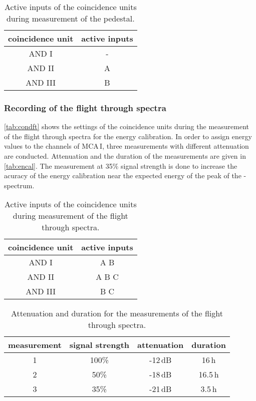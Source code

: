\begin{table}[H]
\caption{Active inputs of the coincidence units during measurement of the pedestal.}
\begin{center}
\begin{tabular}{|c|c|}
  \hline
  coincidence unit	& active inputs	\\ \hline\hline
  AND I				& -				\\ \hline
  AND II			& A				\\ \hline
  AND III			& B				\\ \hline
 \end{tabular}
\end{center}
\label{tab:condped}
\end{table}

\subsubsection{Recording of the flight through spectra}
\autoref{tab:condft} shows the settings of the coincidence units during the measurement of the flight through spectra
for the energy calibration.
In order to assign energy values to the channels of MCA\,I,
three measurements with different attenuation are conducted.
Attenuation and the duration of the measurements are given in \autoref{tab:encal}.
The measurement at 35\% signal strength is done to increase the acuracy of the energy calibration near
the expected energy of the peak of the \textbeta-spectrum.

\begin{table}[H]
\caption{Active inputs of the coincidence units during measurement of the flight through spectra.}
\begin{center}
\begin{tabular}{|c|c|}
  \hline
  coincidence unit	& active inputs	\\ \hline\hline
  AND I				& A B			\\ \hline
  AND II			& A	B C			\\ \hline
  AND III			& B	C			\\ \hline
 \end{tabular}
\end{center}
\label{tab:condft}
\end{table}
\begin{table}[H]
\caption{Attenuation and duration for the measurements of the flight through spectra.}
\begin{center}
\begin{tabular}{|c|c|c|c|}
  \hline
  measurement	& signal strength	& attenuation	& duration	\\ \hline\hline
  1				& 100\%				& -12\,dB		& 16\,h		\\ \hline
  2				& 50\%				& -18\,dB		& 16.5\,h	\\ \hline
  3				& 35\%				& -21\,dB		& 3.5\,h	\\ \hline
 \end{tabular}
\end{center}
\label{tab:encal}
\end{table}


